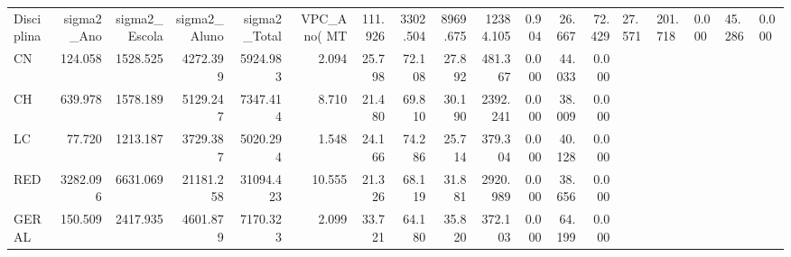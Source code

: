 \begin{tabular}{lrrrrrrrrrrrr}
\toprule
Disciplina & sigma2_Ano & sigma2_Escola & sigma2_Aluno & sigma2_Total & VPC_Ano(%
\midrule
MT & 111.926 & 3302.504 & 8969.675 & 12384.105 & 0.904 & 26.667 & 72.429 & 27.571 & 201.718 & 0.000 & 45.286 & 0.000 \\
CN & 124.058 & 1528.525 & 4272.399 & 5924.983 & 2.094 & 25.798 & 72.108 & 27.892 & 481.367 & 0.000 & 44.033 & 0.000 \\
CH & 639.978 & 1578.189 & 5129.247 & 7347.414 & 8.710 & 21.480 & 69.810 & 30.190 & 2392.241 & 0.000 & 38.009 & 0.000 \\
LC & 77.720 & 1213.187 & 3729.387 & 5020.294 & 1.548 & 24.166 & 74.286 & 25.714 & 379.304 & 0.000 & 40.128 & 0.000 \\
RED & 3282.096 & 6631.069 & 21181.258 & 31094.423 & 10.555 & 21.326 & 68.119 & 31.881 & 2920.989 & 0.000 & 38.656 & 0.000 \\
GERAL & 150.509 & 2417.935 & 4601.879 & 7170.323 & 2.099 & 33.721 & 64.180 & 35.820 & 372.103 & 0.000 & 64.199 & 0.000 \\
\bottomrule
\end{tabular}
